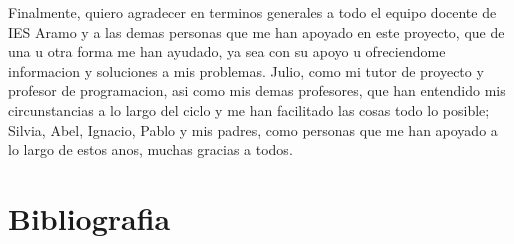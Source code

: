 \documentclass{article}
\begin{document}
Finalmente, quiero agradecer en terminos generales a todo el equipo docente de IES Aramo y a las demas personas que me han apoyado en este proyecto, que de una u otra forma me han ayudado, ya sea con su apoyo u ofreciendome informacion y soluciones a mis problemas. Julio, como mi tutor de proyecto y profesor de programacion, asi como mis demas profesores, que han entendido mis circunstancias a lo largo del ciclo y me han facilitado las cosas todo lo posible; Silvia, Abel, Ignacio, Pablo y mis padres, como personas que me han apoyado a lo largo de estos anos, muchas gracias a todos.

\newpage

\section{Bibliografia}




\end{document}
